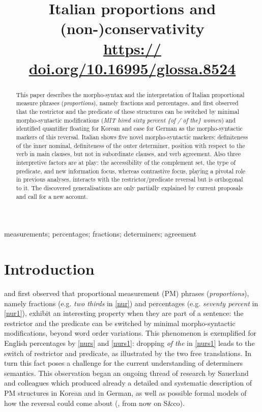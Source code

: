 \documentclass[charis, linguex]{glossa}
\title[Italian proportions]{Italian proportions and (non-)conservativity \\ 
\vspace{0.3cm} \normalsize{\url{https:// doi.org/10.16995/glossa.8524}}}
\author[M. Falco]{
 \spauthor{Michelangelo Falco\\ 
  \institute{Leibniz-Zentrum Allgemeine Sprachwissenschaft}\\
  \small{%
  falco@leibniz-zas.de}
  }
  }
\begin{document}
\maketitle

\begin{abstract}
	
This paper describes the morpho-syntax and the interpretation of Italian
proportional measure phrases (\textit{proportions}), namely fractions and
percentages. \citet{ahn12} and \citet{sau14} first observed that the restrictor
and the predicate of these structures can be switched by minimal
morpho-syntactic modifications (\textit{MIT hired sixty percent \{of / of the\}
women}) and identified quantifier floating for Korean and case for German as
the morpho-syntactic markers of this reversal. Italian shows five novel
morpho-syntactic markers: definiteness of the inner nominal, definiteness of
the outer determiner, position with respect to the verb in main clauses, but
not in subordinate clauses, and verb agreement. Also three interpretive factors
are at play: the accessibility of the complement set, the type of predicate,
and new information focus, whereas contrastive focus, playing a pivotal role in
previous analyses, interacts with the restrictor/predicate reversal but is
orthogonal to it. The discovered generalisations are only partially explained
by current proposals and call for a new account.

\end{abstract}

\begin{keywords}
measurements; percentages; fractions; determiners; agreement
\end{keywords}
\rmfamily


\section{Introduction}\label{Sec:Intro}

\citet{ahn12} and \citet{sau14} first observed that proportional measurement (PM) phrases (\textit{proportions}), namely fractions (e.g. \textit{two thirds} in \ref{nur}) and percentages (e.g. \textit{seventy percent} in \ref{nur1}), exhibit an interesting property when they are part of a sentence: the restrictor and the predicate can be switched by minimal morpho-syntactic modifications, beyond word order variations. This phenomenon is exemplified for English percentages by \ref{nurs} and \ref{nurs1}: dropping \textit{of the} in \ref{nurs1} leads to the switch of restrictor and predicate, as illustrated by the two free translations. In turn this fact poses a challenge for the current understanding of determiners semantics. This observation began an ongoing thread of research by Sauerland and colleagues which produced already a detailed and systematic description of PM structures in Korean and in German, as well as possible formal models of how the reversal could come about (\citealt{ahn15b,ahn15a,ahn17,pas22}, from now on S\&co).
\end{document}
